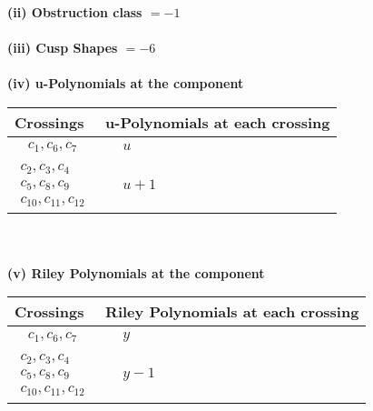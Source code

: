 \documentclass[1p]{elsarticle_modified}
\theoremstyle{definition}
\begin{document}
\flushleft \textbf{(ii) Obstruction class $= -1$}\\~\\
\flushleft \textbf{(iii) Cusp Shapes $= -6$}\\~\\
\newpage\renewcommand{\arraystretch}{1}
\flushleft \textbf{(iv) u-Polynomials at the component}\newline \\
\begin{tabular}{m{50pt}|m{274pt}}
Crossings & \hspace{64pt}u-Polynomials at each crossing \\
\hline $$\begin{aligned}c_{1},c_{6},c_{7}\end{aligned}$$&$\begin{aligned}
&u
\end{aligned}$\\
\hline $$\begin{aligned}c_{2},c_{3},c_{4}\\c_{5},c_{8},c_{9}\\c_{10},c_{11},c_{12}\end{aligned}$$&$\begin{aligned}
&u+1
\end{aligned}$\\
\hline
\end{tabular}\\~\\
\newpage\renewcommand{\arraystretch}{1}
\flushleft \textbf{(v) Riley Polynomials at the component}\newline \\
\begin{tabular}{m{50pt}|m{274pt}}
Crossings & \hspace{64pt}Riley Polynomials at each crossing \\
\hline $$\begin{aligned}c_{1},c_{6},c_{7}\end{aligned}$$&$\begin{aligned}
&y
\end{aligned}$\\
\hline $$\begin{aligned}c_{2},c_{3},c_{4}\\c_{5},c_{8},c_{9}\\c_{10},c_{11},c_{12}\end{aligned}$$&$\begin{aligned}
&y-1
\end{aligned}$\\
\hline
\end{tabular}\\~\\
\end{document}
